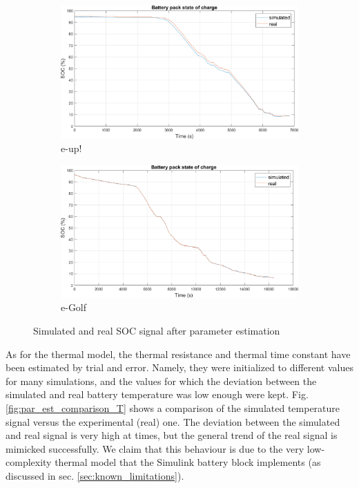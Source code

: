 \begin{figure}[htbp!]
\centering
\begin{subfigure}{\textwidth}
    \centering
    \includegraphics[width=\textwidth]{images/par_est_SOC_eup}
    \caption{e-up!}
\end{subfigure}

\vspace{20pt}

\begin{subfigure}{\textwidth}
    \centering
    \includegraphics[width=\textwidth]{images/par_est_SOC_egolf}
    \caption{e-Golf}
\end{subfigure}
\caption[Simulated and real SOC signal after parameter estimation]{Simulated and real SOC signal after parameter estimation}
\label{fig:par_est_comparison_SOC}
\end{figure}

As for the thermal model, the thermal resistance and thermal time constant have been estimated by trial and error. Namely, they were initialized to different values for many simulations, and the values for which the deviation between the simulated and real battery temperature was low enough were kept. Fig. \ref{fig:par_est_comparison_T} shows a comparison of the simulated temperature signal versus the experimental (real) one. The deviation between the simulated and real signal is very high at times, but the general trend of the real signal is mimicked successfully. We claim that this behaviour is due to the very low-complexity thermal model that the Simulink battery block implements (as discussed in sec. \ref{sec:known_limitations}).

